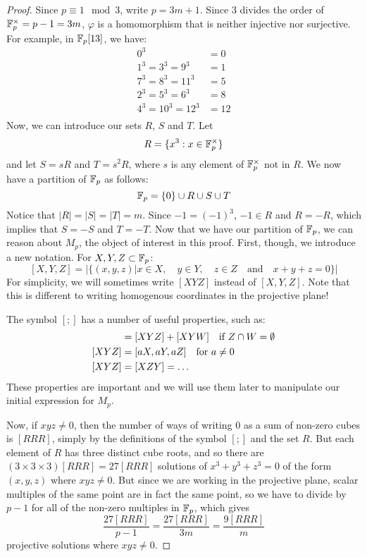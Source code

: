 \begin{proof}
Since $p \equiv 1 \mod{3}$, write $p = 3m + 1$.
Since 3 divides the order of $\mathbb{F}_{p}^{\times} = p-1 = 3m$, $\varphi$ is a homomorphism that is neither injective nor surjective.
For example, in $\mathbb{F}_p[13]$, we have:
\begin{align*}
	0^3 &= 0\\
	1^3 = 3^3 = 9^3 &= 1\\
	7^3 = 8^3 = 11^3 &= 5\\
	2^3 = 5^3 = 6^3 &= 8\\
	4^3 = 10^3 = 12^3 &= 12\\
\end{align*}
Now, we can introduce our sets $R$, $S$ and $T$.
Let
$$R=\{x^3:x\in \mathbb{F}_{p}^{\times}\}$$
and let $S = sR$ and $T = s^2R$, where $s$ is any element of $\mathbb{F}_{p}^{\times}$ not in $R$.
We now have a partition of $\mathbb{F}_p$ as follows:
$$\mathbb{F}_p = \{0\} \cup R \cup S \cup T$$
Notice that $|R| = |S| = |T| = m$.
Since $-1=(-1)^3$, $-1 \in R$ and $R = -R$, which implies that $S=-S$ and $T=-T$.
Now that we have our partition of $\mathbb{F}_p$, we can reason about $M_p$, the object of interest in this proof.
First, though, we introduce a new notation.
For $X,Y,Z \subset \mathbb{F}_p$:
$$[X,Y,Z] = |\{(x,y,z) | x\in X,\quad y\in Y,\quad z\in Z\quad \text{and} \quad x+y+z=0\}|$$
For simplicity, we will sometimes write $[XYZ]$ instead of $[X,Y,Z]$.
Note that this is different to writing homogenous coordinates in the projective plane!

The symbol $[;]$ has a number of useful properties, such as:
\begin{align*}
	[XY(Z\cup W)] &= [XYZ] + [XYW]\quad \si Z\cap W = \emptyset\\
	[XYZ] &= [aX, aY, aZ]\quad \for a\neq0\\
	[XYZ] &= [XZY] = \ldots
\end{align*}
These properties are important and we will use them later to manipulate our initial expression for $M_p$.

Now, if $xyz\neq0$, then the number of ways of writing $0$ as a sum of non-zero cubes is $[RRR]$, simply by the definitions of the symbol $[;]$ and the set $R$.
But each element of $R$ has three distinct cube roots, and so there are $(3 \times 3 \times 3) [RRR] = 27[RRR]$ solutions of $x^3 + y^3 + z^3 = 0$ of the form $(x,y,z)$ where $xyz \neq 0$.
But since we are working in the projective plane, scalar multiples of the same point are in fact the same point, so we have to divide by $p-1$ for all of the non-zero multiples in $\mathbb{F}_p$, which gives
$$\frac{27[RRR]}{p-1} = \frac{27[RRR]}{3m} = \frac{9[RRR]}{m}$$
projective solutions where $xyz\neq0$.


\end{proof}

